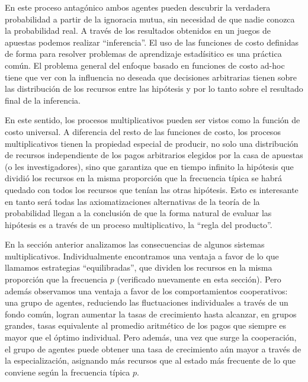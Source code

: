 \documentclass[a4paper,10pt]{book}
\theoremstyle{definition}1
\begin{document}

En este proceso antagónico ambos agentes pueden descubrir la verdadera probabilidad a partir de la ignoracia mutua, sin necesidad de que nadie conozca la probabilidad real.
%
A través de los resultados obtenidos en un juegos de apuestas podemos realizar ``inferencia''.
% 
El uso de las funciones de costo definidas de forma para resolver problemas de aprendizaje estadísitico es una práctica común.
%
El problema general del enfoque basado en funciones de costo ad-hoc tiene que ver con la influencia no deseada que decisiones arbitrarias tienen sobre las distribución de los recursos entre las hipótesis y por lo tanto sobre el resultado final de la inferencia.


En este sentido, los procesos multiplicativos pueden ser vistos como la función de costo universal.
%
A diferencia del resto de las funciones de costo, los procesos multiplicativos tienen la propiedad especial de producir, no solo una distribución de recursos independiente de los pagos arbitrarios elegidos por la casa de apuestas (o les investigadores), sino que garantiza que en tiempo infinito la hipótesis que dividió los recursos en la misma proporción que la frecuencia típica se habrá quedado con todos los recursos que tenían las otras hipótesis.
%
Esto es interesante en tanto será todas las axiomatizaciones alternativas de la teoría de la probabilidad llegan a la conclusión de que la forma natural de evaluar las hipótesis es a través de un proceso multiplicativo, la ``regla del producto''.


En la sección anterior analizamos las consecuencias de algunos sistemas multiplicativos.
%
Individualmente encontramos una ventaja a favor de lo que llamamos estrategias ``equilibradas'', que dividen los recursos en la misma proporción que la frecuencia $p$ (verificado nuevamente en esta sección).
%
Pero además observamos una ventaja a favor de los comportamientos cooperativos: una grupo de agentes, reduciendo las fluctuaciones individuales a través de un fondo común, logran aumentar la tasas de crecimiento hasta alcanzar, en grupos grandes, tasas equivalente al promedio aritmético de los pagos que siempre es mayor que el óptimo individual.
%
Pero además, una vez que surge la cooperación, el grupo de agentes puede obtener una tasa de crecimiento aún mayor a través de la especialización, asignando más recursos que al estado más frecuente de lo que conviene según la frecuencia típica $p$. 
\end{document}
